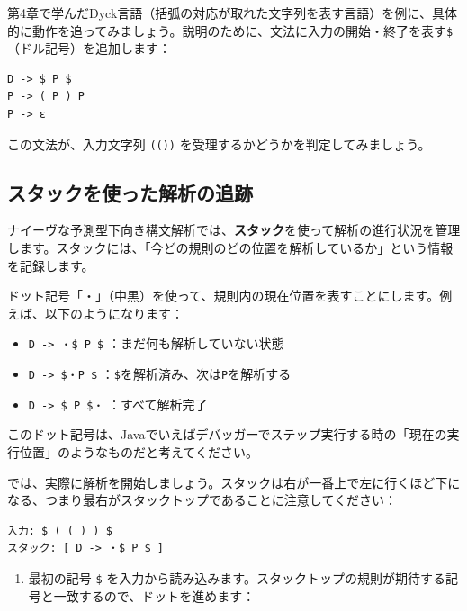 第4章で学んだDyck言語（括弧の対応が取れた文字列を表す言語）を例に、具体的に動作を追ってみましょう。説明のために、文法に入力の開始・終了を表す\texttt{\$}（ドル記号）を追加します：

\begin{verbatim}
D -> $ P $
P -> ( P ) P
P -> ε
\end{verbatim}

この文法が、入力文字列 \texttt{(())} を受理するかどうかを判定してみましょう。

\hypertarget{chapter5-ux30b9ux30bfux30c3ux30afux3092ux4f7fux3063ux305fux89e3ux6790ux306eux8ffdux8de1}{%
\subsection{スタックを使った解析の追跡}\label{chapter5-ux30b9ux30bfux30c3ux30afux3092ux4f7fux3063ux305fux89e3ux6790ux306eux8ffdux8de1}}

ナイーヴな予測型下向き構文解析では、\textbf{スタック}を使って解析の進行状況を管理します。スタックには、「今どの規則のどの位置を解析しているか」という情報を記録します。

ドット記号「・」（中黒）を使って、規則内の現在位置を表すことにします。例えば、以下のようになります：

\begin{itemize}
\tightlist
\item
  \texttt{D\ -\textgreater{}\ ・\$\ P\ \$} ：まだ何も解析していない状態
\item
  \texttt{D\ -\textgreater{}\ \$・P\ \$}
  ：\texttt{\$}を解析済み、次は\texttt{P}を解析する
\item
  \texttt{D\ -\textgreater{}\ \$\ P\ \$・} ：すべて解析完了
\end{itemize}

このドット記号は、Javaでいえばデバッガーでステップ実行する時の「現在の実行位置」のようなものだと考えてください。

では、実際に解析を開始しましょう。スタックは右が一番上で左に行くほど下になる、つまり最右がスタックトップであることに注意してください：

\begin{verbatim}
入力: $ ( ( ) ) $
スタック: [ D -> ・$ P $ ]
\end{verbatim}

\begin{enumerate}
\def\labelenumi{\arabic{enumi}.}
\tightlist
\item
  最初の記号 \texttt{\$}
  を入力から読み込みます。スタックトップの規則が期待する記号と一致するので、ドットを進めます：
\end{enumerate}

